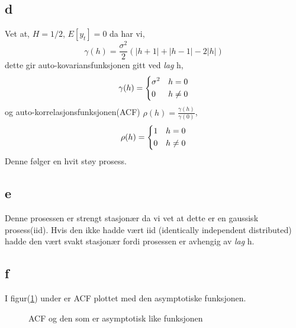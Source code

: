 \documentclass[12pt]{article}
\begin{document}
{\subsection{d}

Vet at,
$H = 1/2$, $E[y_{t}] = 0$
da har vi,
\begin{equation}
  \gamma(h) = \frac{\sigma^2}{2}(|h+1| + |h-1| -2|h|)
\end{equation}
dette gir auto-kovariansfunksjonen gitt ved \emph{lag} h,
\[
 \gamma(h) = \begin{dcases}
      \sigma^2  & h = 0 \\
      0 & h \neq 0 \\
  \end{dcases}
\]
og auto-korrelasjonsfunksjonen(ACF) $\rho(h) = \frac{\gamma(h)}{\gamma(0)}$,
\[
 \rho(h) = \begin{dcases}
      1 & h = 0 \\
      0 & h \neq 0 \\
  \end{dcases}
\]
Denne følger en hvit støy prosess.


\subsection{e}
Denne prosessen er strengt stasjonær da vi vet at dette er en gaussisk prosess(iid).
Hvis den ikke hadde vært iid (identically independent distributed) hadde den vært svakt stasjonær fordi prosessen er avhengig av \emph{lag} h.



\subsection{f}
I figur(\ref{asymp}) under er ACF plottet med den asymptotiske funksjonen.
\begin{figure}[hbt!]
\caption{ACF og den som er asymptotisk like funksjonen}
\label{asymp}
\end{figure}

}
\end{document}
